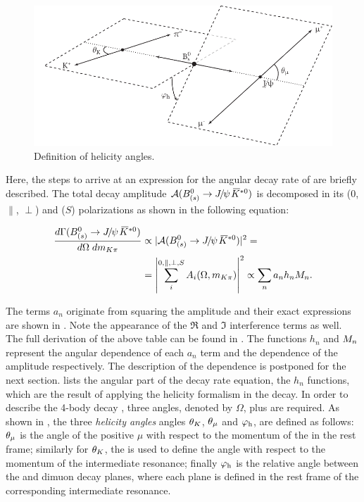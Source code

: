 \begin{figure}[t]
  \centering
  \includegraphics[width=\textwidth]{Figures/Chapter4/helAngles}
  \caption{Definition of helicity angles.}
  \label{helAngles}
\end{figure}

Here, the steps to arrive at an expression for the angular decay rate of \BsJpsiKst are briefly described.
The total decay amplitude $\mathcal{A}(\text{\BJpsiKst})$ is decomposed in its \pwave ($0$, $\parallel$, $\perp$)
and \swave ($S$) polarizations as shown in the following equation:

\begin{align}
  \centering
  \frac{d\Gamma(\text{\BJpsiKst})}{d\Omega\;d\mkpi} &\propto |\mathcal{A}(\text{\BJpsiKst})|^2 = \nonumber \\
                                                    &= \left| \sum_i^{0,\parallel,\perp,S} A_i(\Omega,\mkpi) \right|^2  \propto \sum_n a_n h_n \mKpiAmp.
  \label{ang_terms}
\end{align}

\noindent The terms $a_n$ originate from squaring the amplitude and their exact expressions are shown in .
Note the appearance of the $\Re$ and $\Im$ interference terms as well. The full derivation of the above table can be found in \cite{jeroenThesis}.
The functions $h_n$ and $M_{n}$ represent the angular dependence of each $a_n$ term and the \mkpi
dependence of the amplitude respectively. The description of the \mkpi dependence is postponed for the next section. 
lists the angular part of the decay rate equation, \ie the $h_n$ functions, which are the result of
applying the helicity formalism in the \BJpsiKst decay. In order to describe the 4-body decay \BJpsiKst, three
angles, denoted by $\Omega$, plus \mkpi are required. As shown in , the three \emph{helicity angles} angles
$\theta_{K}$, $\theta_{\mu}$ and $\varphi_{\rm h}$, are defined as follows: $\theta_{\mu}$ is the angle of the positive $\mu$ with respect to the
momentum of the \jpsi in the \Bs rest frame; similarly for $\theta_{K}$, the \kaon is used to define the angle with respect to
the momentum of the intermediate \Kpi resonance; finally $\varphi_{\rm h}$ is the relative angle between the \Kpi and dimuon decay
planes, where each plane is defined in the rest frame of the corresponding intermediate resonance.

